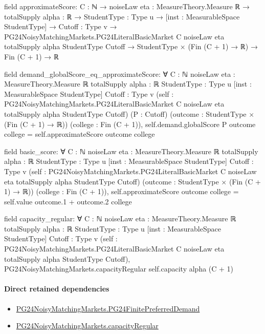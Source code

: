 \documentclass[10pt]{article}
\begin{document}
\begin{ReviewVerbatim}
field approximateScore:
{C : ℕ} →
  {noiseLaw eta : MeasureTheory.Measure ℝ} →
    {totalSupply alpha : ℝ} →
      {StudentType : Type u} →
        [inst : MeasurableSpace StudentType] →
          {Cutoff : Type v} →
            PG24NoisyMatchingMarkets.PG24LiteralBasicMarket C noiseLaw eta totalSupply alpha StudentType Cutoff →
              StudentType × (Fin (C + 1) → ℝ) → Fin (C + 1) → ℝ

field demand_globalScore_eq_approximateScore:
∀ {C : ℕ} {noiseLaw eta : MeasureTheory.Measure ℝ} {totalSupply alpha : ℝ} {StudentType : Type u}
  [inst : MeasurableSpace StudentType] {Cutoff : Type v}
  (self : PG24NoisyMatchingMarkets.PG24LiteralBasicMarket C noiseLaw eta totalSupply alpha StudentType Cutoff)
  (P : Cutoff) (outcome : StudentType × (Fin (C + 1) → ℝ)) (college : Fin (C + 1)),
  self.demand.globalScore P outcome college = self.approximateScore outcome college

field basic_score:
∀ {C : ℕ} {noiseLaw eta : MeasureTheory.Measure ℝ} {totalSupply alpha : ℝ} {StudentType : Type u}
  [inst : MeasurableSpace StudentType] {Cutoff : Type v}
  (self : PG24NoisyMatchingMarkets.PG24LiteralBasicMarket C noiseLaw eta totalSupply alpha StudentType Cutoff)
  (outcome : StudentType × (Fin (C + 1) → ℝ)) (college : Fin (C + 1)),
  self.approximateScore outcome college = self.value outcome.1 + outcome.2 college

field capacity_regular:
∀ {C : ℕ} {noiseLaw eta : MeasureTheory.Measure ℝ} {totalSupply alpha : ℝ} {StudentType : Type u}
  [inst : MeasurableSpace StudentType] {Cutoff : Type v}
  (self : PG24NoisyMatchingMarkets.PG24LiteralBasicMarket C noiseLaw eta totalSupply alpha StudentType Cutoff),
  PG24NoisyMatchingMarkets.capacityRegular self.capacity alpha (C + 1)
\end{ReviewVerbatim}

\paragraph{Direct retained dependencies}
\begin{itemize}\raggedright
\item \hyperlink{governing-declaration-5abddabcc3314102}{PG24\allowbreak{}Noisy\allowbreak{}Matching\allowbreak{}Markets.\allowbreak{}PG24\allowbreak{}Finite\allowbreak{}Preferred\allowbreak{}Demand}
\item \hyperlink{governing-declaration-b45d6cdc9883a614}{PG24\allowbreak{}Noisy\allowbreak{}Matching\allowbreak{}Markets.\allowbreak{}capacity\allowbreak{}Regular}
\end{itemize}
\end{document}
